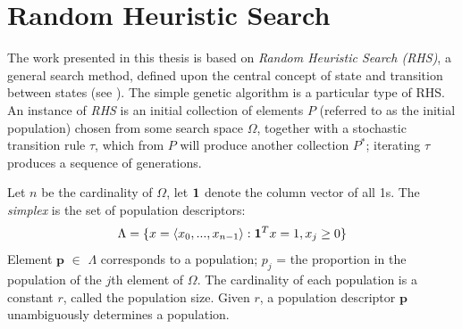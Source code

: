 \section{Random Heuristic Search}
The work presented in this thesis is based on {\em Random Heuristic Search (RHS)}, 
a general search method, defined upon the central concept of state and transition 
between states (see \cite{Vose1999}). The simple genetic algorithm is a particular type of RHS. 
An instance of {\em RHS} is an initial collection of elements $P$ (referred to as the initial population) chosen 
from some search space $\Omega$, together with a stochastic transition rule $\tau$, which from $P$ will 
produce another collection $P^\ast$; iterating $\tau$ produces a sequence of generations.

Let $n$ be the cardinality 
of $\Omega$, let ${\bf1}$ denote the column vector of all 1s. 
The {\em simplex} is the set of population descriptors:
\[
\Lambda = \{x = \langle x_0,...,x_{n-1} \rangle: {\bf1}^T x=1, x_j \geq 0 \} %
\]
Element $\bm{p}$ $\in$ $\Lambda$ corresponds to a population;
$p_j$ = the proportion in the population of the $j$th element of $\Omega$. 
The cardinality of each population is a constant $r$, called the population size. 
Given $r$, a population descriptor $\bm{p}$ unambiguously determines a population.

